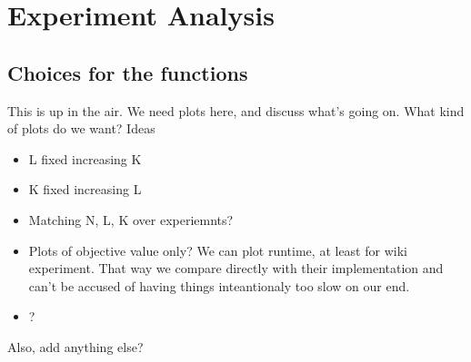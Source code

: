 \section{Experiment Analysis}
\label{sec::exp_analysis}

\subsection{Choices for the functions}

This is up in the air. We need plots here, and discuss what's going on. What kind of plots do we want? Ideas

\begin{itemize}
	\item L fixed increasing K
	\item K fixed increasing L
	\item Matching N, L, K over experiemnts?
	\item Plots of objective value only? We can plot runtime, at least for wiki experiment. That way we compare directly with their implementation and can't be accused of having things inteantionaly too slow on our end. 
	\item ?
\end{itemize}

Also, add anything else?